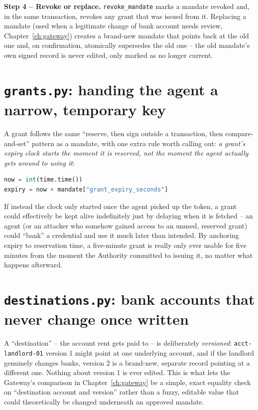 \documentclass[11pt]{report}
\newcommand{\file}[1]{\texttt{#1}}
\newcommand{\code}[1]{\texttt{#1}}
\begin{document}
\textbf{Step 4 -- Revoke or replace.} \code{revoke\_mandate} marks a
mandate revoked and, in the same transaction, revokes any grant that was
issued from it. Replacing a mandate (used when a legitimate change of
bank account needs review, Chapter~\ref{ch:gateway}) creates a
brand-new mandate that points back at the old one and, on confirmation,
atomically supersedes the old one -- the old mandate's own signed record
is never edited, only marked as no longer current.

\section{\file{grants.py}: handing the agent a narrow, temporary key}

A grant follows the same ``reserve, then sign outside a transaction, then
compare-and-set'' pattern as a mandate, with one extra rule worth calling
out: \emph{a grant's expiry clock starts the moment it is reserved, not
the moment the agent actually gets around to using it}:

\begin{lstlisting}[language=Python]
now = int(time.time())
expiry = now + mandate["grant_expiry_seconds"]
\end{lstlisting}

\begin{whyitmatters}
If instead the clock only started once the agent picked up the token, a
grant could effectively be kept alive indefinitely just by delaying when
it is fetched -- an agent (or an attacker who somehow gained access to an
unused, reserved grant) could ``bank'' a credential and use it much later
than intended. By anchoring expiry to reservation time, a five-minute
grant is really only ever usable for five minutes from the moment the
Authority committed to issuing it, no matter what happens afterward.
\end{whyitmatters}

\section{\file{destinations.py}: bank accounts that never change once written}

A ``destination'' -- the account rent gets paid to -- is deliberately
\emph{versioned}: \code{acct-landlord-01} version 1 might point at one
underlying account, and if the landlord genuinely changes banks, version
2 is a brand-new, separate record pointing at a different one. Nothing
about version 1 is ever edited. This is what lets the Gateway's
comparison in Chapter~\ref{ch:gateway} be a simple, exact equality check
on ``destination account and version'' rather than a fuzzy, editable
value that could theoretically be changed underneath an approved mandate.
\end{document}
